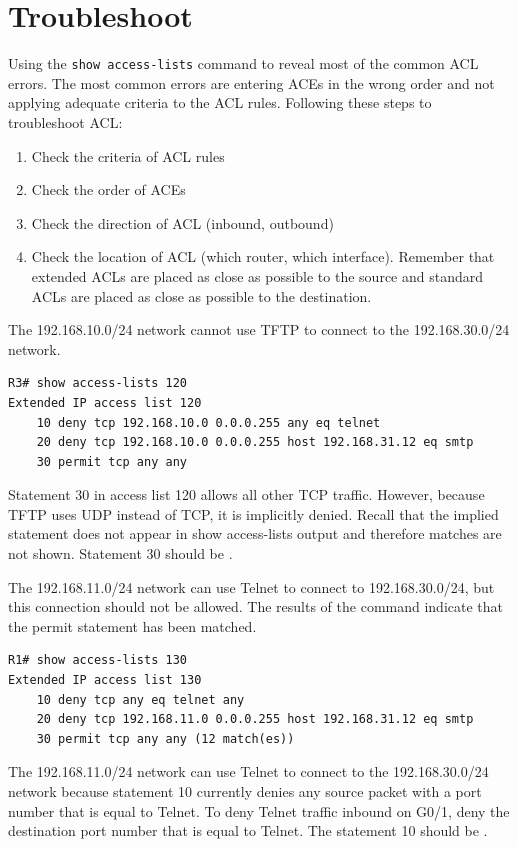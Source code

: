 \section{Troubleshoot}

Using the \texttt{show access-lists} command to reveal most of the common ACL errors. The most common errors are entering ACEs in the wrong order and not applying adequate criteria to the ACL rules. Following these steps to troubleshoot ACL:

\begin{enumerate}
\item Check the criteria of ACL rules
\item Check the order of ACEs
\item Check the direction of ACL (inbound, outbound)
\item Check the location of ACL (which router, which interface). Remember that extended ACLs are placed as close as possible to the source and standard ACLs are placed as close as possible to the destination.
\end{enumerate}

\begin{example}
The 192.168.10.0/24 network cannot use TFTP to connect to the 192.168.30.0/24 network.
\begin{verbatim}
R3# show access-lists 120
Extended IP access list 120
    10 deny tcp 192.168.10.0 0.0.0.255 any eq telnet
    20 deny tcp 192.168.10.0 0.0.0.255 host 192.168.31.12 eq smtp
    30 permit tcp any any
\end{verbatim}
Statement 30 in access list 120 allows all other TCP traffic. However, because TFTP uses UDP instead of TCP, it is implicitly denied. Recall that the implied  statement does not appear in show access-lists output and therefore matches are not shown. Statement 30 should be .
\end{example}


\begin{example}
The 192.168.11.0/24 network can use Telnet to connect to 192.168.30.0/24, but this connection should not be allowed. The results of the  command indicate that the permit statement has been matched.
\begin{verbatim}
R1# show access-lists 130
Extended IP access list 130
    10 deny tcp any eq telnet any
    20 deny tcp 192.168.11.0 0.0.0.255 host 192.168.31.12 eq smtp
    30 permit tcp any any (12 match(es))
\end{verbatim}
The 192.168.11.0/24 network can use Telnet to connect to the 192.168.30.0/24 network because statement 10 currently denies any source packet with a port number that is equal to Telnet. To deny Telnet traffic inbound on G0/1, deny the destination port number that is equal to Telnet. The statement 10 should be .
\end{example}